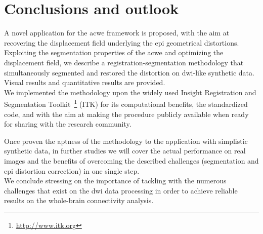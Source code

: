 \section{Conclusions and outlook}
\label{sec:conclusion}
%
A novel application for the \ac{acwe} framework is proposed,
with the aim at recovering the displacement field underlying 
the \ac{epi} geometrical distortions. Exploiting the segmentation
properties of the \ac{acwe} and optimizing the displacement
field, we describe a registration-segmentation methodology that
simultaneously segmented and restored the distortion on 
\ac{dwi}-like synthetic data. Visual results and quantitative
results are provided. \\

We implemented the methodology upon the widely used
Insight Registration and Segmentation 
Toolkit~\footnote{\url{http://www.itk.org}} (ITK)
for its computational benefits, the standardized code, and 
with the aim at making the procedure publicly available 
when ready for sharing with the research community.

Once proven the aptness of the methodology to the application
with simplistic synthetic data, in further studies we will 
cover the actual performance on real images and the benefits 
of overcoming the described challenges (segmentation and 
\ac{epi} distortion correction) in one single step.\\

We conclude stressing on the importance of tackling with
the numerous challenges that exist on the \ac{dwi} data 
processing in order to achieve reliable results on the
whole-brain connectivity analysis.
